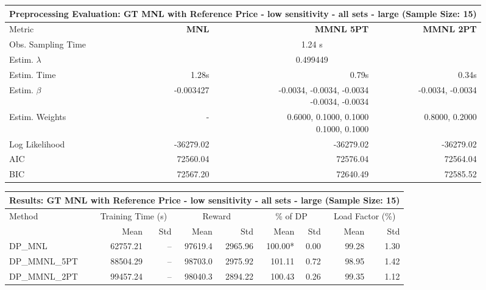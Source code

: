 
\begin{samepage}
\begin{center}
  \small
  \begin{tabular}{l|r|r|r}
    \toprule
    \multicolumn{4}{c}{\textbf{Preprocessing Evaluation: GT MNL with Reference Price - low sensitivity - all sets - large (Sample Size: 15)}} \\
    \midrule
    Metric & \textbf{MNL} & \textbf{MMNL 5PT} & \textbf{MMNL 2PT} \\
    \midrule
    Obs. Sampling Time & \multicolumn{3}{c}{1.24 s} \\
    Estim. $\lambda$ & \multicolumn{3}{c}{0.499449} \\
    Estim. Time & 1.28s & 0.79s & 0.34s \\
    Estim. $\beta$ & -0.003427 & \makecell[tr]{-0.0034, -0.0034, -0.0034 \\ -0.0034, -0.0034} & -0.0034, -0.0034 \\
    Estim. Weights & - & \makecell[tr]{0.6000, 0.1000, 0.1000 \\ 0.1000, 0.1000} & 0.8000, 0.2000 \\
    Log Likelihood & -36279.02 & -36279.02 & -36279.02 \\
    AIC & 72560.04 & 72576.04 & 72564.04 \\
    BIC & 72567.20 & 72640.49 & 72585.52 \\
    \bottomrule
  \end{tabular}
\end{center}
\begin{center}
  \small
  \begin{tabular}{l|rr|rr|rr|rr}
    \toprule
    \multicolumn{9}{c}{\textbf{Results: GT MNL with Reference Price - low sensitivity - all sets - large (Sample Size: 15)}} \\
    \midrule
    Method & \multicolumn{2}{c|}{Training Time (s)} & \multicolumn{2}{c|}{Reward} & \multicolumn{2}{c|}{\% of DP} & \multicolumn{2}{c}{Load Factor (\%)} \\
    & Mean & Std & Mean & Std & Mean & Std & Mean & Std \\
    \midrule
    DP\_MNL      & 62757.21 &    -- &    97619.4 &    2965.96 & 100.00* &    0.00 &   99.28 &    1.30 \\
    DP\_MMNL\_5PT & 88504.29 &    -- &    98703.0 &    2975.92 &  101.11 &    0.72 &   98.95 &    1.42 \\
    DP\_MMNL\_2PT & 99457.24 &    -- &    98040.3 &    2894.22 &  100.43 &    0.26 &   99.35 &    1.12 \\

\end{tabular}
\end{center}
\end{samepage}
